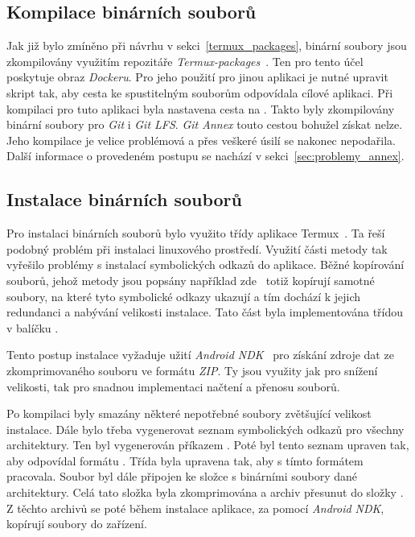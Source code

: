     \subsection{Kompilace binárních souborů}
    Jak již bylo zmíněno při návrhu v sekci~\ref{termux_packages}, binární soubory jsou zkompilovány využitím repozitáře \emph{Termux-packages}~. Ten pro tento účel poskytuje obraz \emph{Dockeru}. Pro jeho použití pro jinou aplikaci je nutné upravit skript  tak, aby cesta ke spustitelným souborům odpovídala cílové aplikaci. Při kompilaci pro tuto aplikaci byla nastavena cesta  na . Takto byly zkompilovány binární soubory pro \emph{Git} i \emph{Git LFS}. \emph{Git Annex} touto cestou bohužel získat nelze. Jeho kompilace je velice problémová a přes veškeré úsilí se nakonec nepodařila. Další informace o provedeném postupu se nachází v sekci~\ref{sec:problemy_annex}.

    \subsection{Instalace binárních souborů}
    Pro instalaci binárních souborů bylo využito třídy  aplikace Termux~. Ta řeší podobný problém při instalaci linuxového prostředí. Využití části metody  tak vyřešilo problémy s instalací symbolických odkazů do aplikace. Běžné kopírování souborů, jehož metody jsou popsány například zde~ totiž kopírují samotné soubory, na které tyto symbolické odkazy ukazují a tím dochází k jejich redundanci a nabývání velikosti instalace. Tato část byla implementována třídou  v balíčku .

    Tento postup instalace vyžaduje užití \emph{Android NDK}~ pro získání zdroje dat ze zkomprimovaného souboru ve formátu \emph{ZIP}. Ty jsou využity jak pro snížení velikosti, tak pro snadnou implementaci načtení a přenosu souborů.

    Po kompilaci byly smazány některé nepotřebné soubory zvětšující velikost instalace. Dále bylo třeba vygenerovat seznam symbolických odkazů pro všechny architektury. Ten byl vygenerován příkazem . Poté byl tento seznam upraven tak, aby odpovídal formátu . Třída  byla upravena tak, aby s tímto formátem pracovala. Soubor  byl dále připojen ke složce s binárními soubory dané architektury. Celá tato složka byla zkomprimována a archiv přesunut do složky . Z těchto archivů se poté během instalace aplikace, za pomocí \emph{Android NDK}, kopírují soubory do zařízení.

